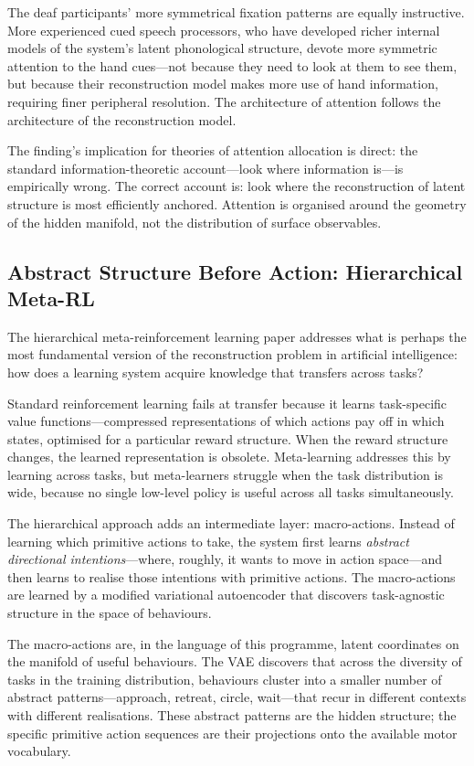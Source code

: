 \documentclass[12pt, letterpaper]{article}
\theoremstyle{remark}
\begin{document}
The deaf participants' more symmetrical fixation patterns are equally
instructive.  More experienced cued speech processors, who have developed
richer internal models of the system's latent phonological structure, devote
more symmetric attention to the hand cues---not because they need to look
at them to see them, but because their reconstruction model makes more use
of hand information, requiring finer peripheral resolution.  The architecture
of attention follows the architecture of the reconstruction model.

The finding's implication for theories of attention allocation is direct:
the standard information-theoretic account---look where information is---is
empirically wrong.  The correct account is: look where the reconstruction
of latent structure is most efficiently anchored.  Attention is organised
around the geometry of the hidden manifold, not the distribution of surface
observables.

\subsection{Abstract Structure Before Action: Hierarchical Meta-RL}

The hierarchical meta-reinforcement learning paper addresses what is perhaps
the most fundamental version of the reconstruction problem in artificial
intelligence: how does a learning system acquire knowledge that transfers
across tasks?

Standard reinforcement learning fails at transfer because it learns
task-specific value functions---compressed representations of which actions
pay off in which states, optimised for a particular reward structure.  When
the reward structure changes, the learned representation is obsolete.
Meta-learning addresses this by learning across tasks, but meta-learners
struggle when the task distribution is wide, because no single low-level
policy is useful across all tasks simultaneously.

The hierarchical approach adds an intermediate layer: macro-actions.  Instead
of learning which primitive actions to take, the system first learns
\emph{abstract directional intentions}---where, roughly, it wants to move
in action space---and then learns to realise those intentions with primitive
actions.  The macro-actions are learned by a modified variational autoencoder
that discovers task-agnostic structure in the space of behaviours.

The macro-actions are, in the language of this programme, latent coordinates
on the manifold of useful behaviours.  The VAE discovers that across the
diversity of tasks in the training distribution, behaviours cluster into a
smaller number of abstract patterns---approach, retreat, circle, wait---that
recur in different contexts with different realisations.  These abstract
patterns are the hidden structure; the specific primitive action sequences
are their projections onto the available motor vocabulary.
\end{document}
